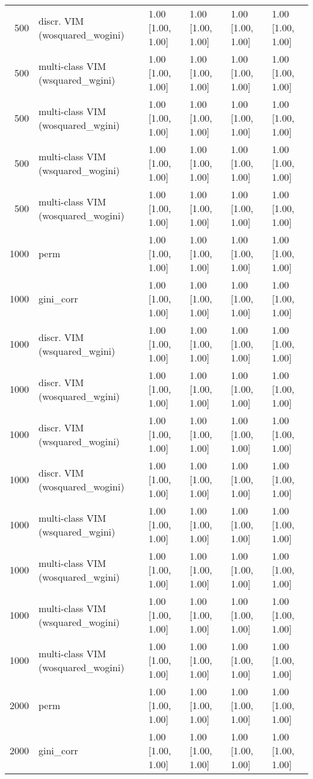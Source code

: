\begin{table}[ht]
\begin{tabular}{rlllll}
  500 & discr. VIM (wosquared\_wogini) & 1.00 [1.00, 1.00] & 1.00 [1.00, 1.00] & 1.00 [1.00, 1.00] & 1.00 [1.00, 1.00] \\ 
  500 & multi-class VIM (wsquared\_wgini) & 1.00 [1.00, 1.00] & 1.00 [1.00, 1.00] & 1.00 [1.00, 1.00] & 1.00 [1.00, 1.00] \\ 
  500 & multi-class VIM (wosquared\_wgini) & 1.00 [1.00, 1.00] & 1.00 [1.00, 1.00] & 1.00 [1.00, 1.00] & 1.00 [1.00, 1.00] \\ 
  500 & multi-class VIM (wsquared\_wogini) & 1.00 [1.00, 1.00] & 1.00 [1.00, 1.00] & 1.00 [1.00, 1.00] & 1.00 [1.00, 1.00] \\ 
  500 & multi-class VIM (wosquared\_wogini) & 1.00 [1.00, 1.00] & 1.00 [1.00, 1.00] & 1.00 [1.00, 1.00] & 1.00 [1.00, 1.00] \\ 
   \hline 1000 & perm & 1.00 [1.00, 1.00] & 1.00 [1.00, 1.00] & 1.00 [1.00, 1.00] & 1.00 [1.00, 1.00] \\ 
  1000 & gini\_corr & 1.00 [1.00, 1.00] & 1.00 [1.00, 1.00] & 1.00 [1.00, 1.00] & 1.00 [1.00, 1.00] \\ 
  1000 & discr. VIM (wsquared\_wgini) & 1.00 [1.00, 1.00] & 1.00 [1.00, 1.00] & 1.00 [1.00, 1.00] & 1.00 [1.00, 1.00] \\ 
  1000 & discr. VIM (wosquared\_wgini) & 1.00 [1.00, 1.00] & 1.00 [1.00, 1.00] & 1.00 [1.00, 1.00] & 1.00 [1.00, 1.00] \\ 
  1000 & discr. VIM (wsquared\_wogini) & 1.00 [1.00, 1.00] & 1.00 [1.00, 1.00] & 1.00 [1.00, 1.00] & 1.00 [1.00, 1.00] \\ 
  1000 & discr. VIM (wosquared\_wogini) & 1.00 [1.00, 1.00] & 1.00 [1.00, 1.00] & 1.00 [1.00, 1.00] & 1.00 [1.00, 1.00] \\ 
  1000 & multi-class VIM (wsquared\_wgini) & 1.00 [1.00, 1.00] & 1.00 [1.00, 1.00] & 1.00 [1.00, 1.00] & 1.00 [1.00, 1.00] \\ 
  1000 & multi-class VIM (wosquared\_wgini) & 1.00 [1.00, 1.00] & 1.00 [1.00, 1.00] & 1.00 [1.00, 1.00] & 1.00 [1.00, 1.00] \\ 
  1000 & multi-class VIM (wsquared\_wogini) & 1.00 [1.00, 1.00] & 1.00 [1.00, 1.00] & 1.00 [1.00, 1.00] & 1.00 [1.00, 1.00] \\ 
  1000 & multi-class VIM (wosquared\_wogini) & 1.00 [1.00, 1.00] & 1.00 [1.00, 1.00] & 1.00 [1.00, 1.00] & 1.00 [1.00, 1.00] \\ 
   \hline 2000 & perm & 1.00 [1.00, 1.00] & 1.00 [1.00, 1.00] & 1.00 [1.00, 1.00] & 1.00 [1.00, 1.00] \\ 
  2000 & gini\_corr & 1.00 [1.00, 1.00] & 1.00 [1.00, 1.00] & 1.00 [1.00, 1.00] & 1.00 [1.00, 1.00] \\ 

\end{tabular}
\end{table}
